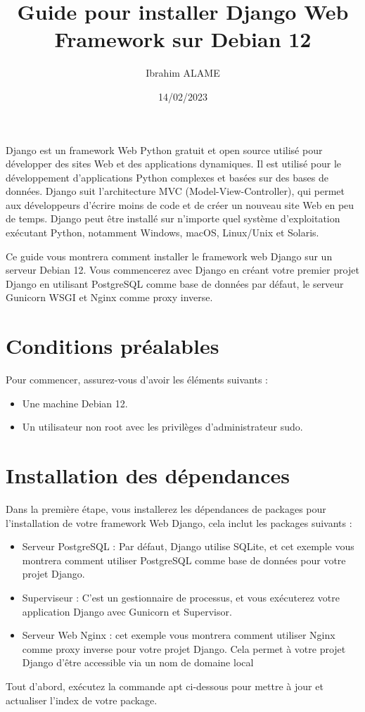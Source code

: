 \documentclass{article}
\title{Guide pour installer Django Web Framework sur Debian 12}
\author{Ibrahim ALAME}
\date{14/02/2023}
\begin{document}
\maketitle

Django est un framework Web Python gratuit et open source utilisé pour développer des sites Web et des applications dynamiques. Il est utilisé pour le développement d'applications Python complexes et basées sur des bases de données.
Django suit l'architecture MVC (Model-View-Controller), qui permet aux développeurs d'écrire moins de code et de créer un nouveau site Web en peu de temps. Django peut être installé sur n'importe quel système d'exploitation exécutant Python, notamment Windows, macOS, Linux/Unix et Solaris.


Ce guide vous montrera comment installer le framework web Django sur un serveur Debian 12. Vous commencerez avec Django en créant votre premier projet Django en utilisant PostgreSQL comme base de données par défaut, le serveur Gunicorn WSGI et Nginx comme proxy inverse.



\section{Conditions préalables}  

Pour commencer, assurez-vous d'avoir les éléments suivants :
\begin{itemize}
\item Une machine Debian 12.
\item Un utilisateur non root avec les privilèges d'administrateur sudo.
\end{itemize}
\section{Installation des dépendances}
Dans la première étape, vous installerez les dépendances de packages pour l'installation de votre framework Web Django, cela inclut les packages suivants :
\begin{itemize}
\item Serveur PostgreSQL : Par défaut, Django utilise SQLite, et cet exemple vous montrera comment utiliser PostgreSQL comme base de données pour votre projet Django.
\item Superviseur : C'est un gestionnaire de processus, et vous exécuterez votre application Django avec Gunicorn et Supervisor.
\item Serveur Web Nginx : cet exemple vous montrera comment utiliser Nginx comme proxy inverse pour votre projet Django. Cela permet à votre projet Django d'être accessible via un nom de domaine local
\end{itemize}
Tout d’abord, exécutez la commande apt ci-dessous pour mettre à jour et actualiser l’index de votre package.
\end{document}
